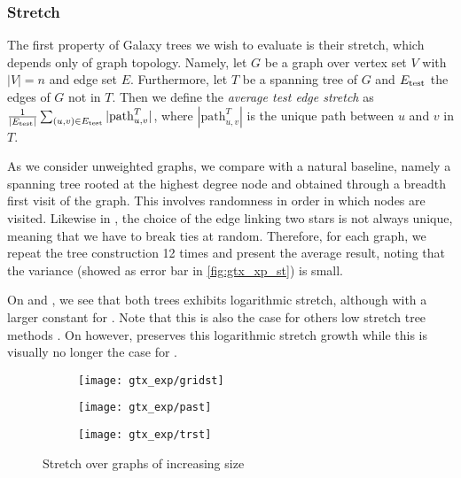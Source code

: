 \subsubsection{Stretch}

The first property of Galaxy trees we wish to evaluate is their stretch, which depends only of graph
topology. Namely, let $G$ be a graph over vertex set $V$ with $|V|=n$ and edge set
$E$. Furthermore, let $T$ be a
spanning tree of $G$ and $E_{\mathrm{test}}{}$ the edges of $G$ not in $T$. Then we define the \emph{average
test edge stretch} as $\frac{1}{|E_{\mathrm{test}}{}|} \sum_{(u,v) \in E_{\mathrm{test}}{}} |\mathrm{path}^T_{u,v}|$,
where $|\mathrm{path}^T_{u,v}|$ is the unique path between $u$ and $v$ in $T$.

As we consider unweighted graphs, we compare \gtx{} with a natural baseline, namely a spanning tree
rooted at the highest degree node and obtained through a breadth first visit of the graph. This
involves randomness in order in which nodes are visited. Likewise in \gtx{}, the choice of the edge
linking two stars is not always unique, meaning that we have to break ties at random.  Therefore,
for each graph, we repeat the tree construction 12 times and present the average result, noting that
the variance (showed as error bar in \autoref{fig:gtx_xp_st}) is small.

On \lpa{} and \triangle{}, we see that both trees exhibits logarithmic stretch, although with a
larger constant for \gtx{}. Note that this is also the case for others low stretch tree methods
\autocite[\S 5.3.1]{papplow}. On \grid{} however, \gtx{} preserves this logarithmic stretch growth
while this is visually no longer the case for \bfs{}.

\begin{figure}[tbh]
	\centering
	\begin{subfigure}[b]{0.9\textwidth}
		\texttt{[image: gtx\_exp/gridst]}
		\caption{\grid{} }\label{fig:gtx_xp_gridst}
	\end{subfigure}

	\begin{subfigure}[b]{0.9\textwidth}
		\texttt{[image: gtx\_exp/past]}
		\caption{\lpa{} }\label{fig:gtx_xp_past}
	\end{subfigure}

	\begin{subfigure}[b]{0.9\textwidth}
		\texttt{[image: gtx\_exp/trst]}
		\caption{\triangle{} }\label{fig:gtx_xp_trst}
	\end{subfigure}
	\caption{Stretch over graphs of increasing size}\label{fig:gtx_xp_st}
\end{figure}

